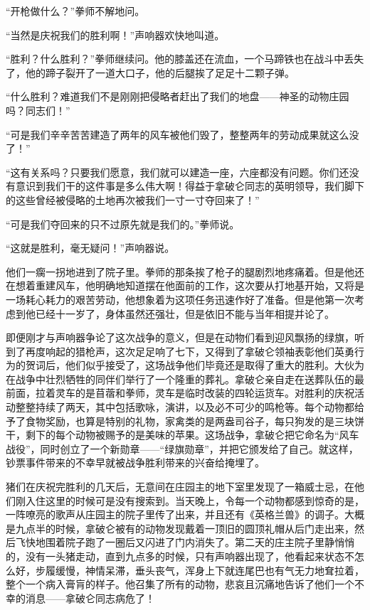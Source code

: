 “开枪做什么？”拳师不解地问。

“当然是庆祝我们的胜利啊！”声响器欢快地叫道。

“胜利？什么胜利？”拳师继续问。他的膝盖还在流血，一个马蹄铁也在战斗中丢失了，他的蹄子裂开了一道大口子，他的后腿挨了足足十二颗子弹。

“什么胜利？难道我们不是刚刚把侵略者赶出了我们的地盘——神圣的动物庄园吗？同志们！”

“可是我们辛辛苦苦建造了两年的风车被他们毁了，整整两年的劳动成果就这么没了！”

“这有关系吗？只要我们愿意，我们就可以建造一座，六座都没有问题。你们还没有意识到我们干的这件事是多么伟大啊！得益于拿破仑同志的英明领导，我们脚下的这些曾经被侵略的土地再次被我们一寸一寸夺回来了！”

“可是我们夺回来的只不过原先就是我们的。”拳师说。

“这就是胜利，毫无疑问！”声响器说。

他们一瘸一拐地进到了院子里。拳师的那条挨了枪子的腿剧烈地疼痛着。但是他还在想着重建风车，他明确地知道摆在他面前的工作，这次要从打地基开始，又将是一场耗心耗力的艰苦劳动，他想象着为这项任务迅速作好了准备。但是他第一次考虑到他已经十一岁了，身体虽然还强壮，但是依旧不能与当年相提并论了。

即便刚才与声响器争论了这次战争的意义，但是在动物们看到迎风飘扬的绿旗，听到了再度响起的猎枪声，这次足足响了七下，又得到了拿破仑领袖表彰他们英勇行为的贺词后，他们似乎接受了，这场战争他们毕竟还是取得了重大的胜利。大伙为在战争中壮烈牺牲的同伴们举行了一个隆重的葬礼。拿破仑亲自走在送葬队伍的最前面，拉着灵车的是苜蓿和拳师，灵车是临时改装的四轮运货车。对胜利的庆祝活动整整持续了两天，其中包括歌咏，演讲，以及必不可少的鸣枪等。每个动物都给予了食物奖励，也算是特别的礼物，家禽类的是两盎司谷子，每只狗发的是三块饼干，剩下的每个动物被赐予的是美味的苹果。这场战争，拿破仑把它命名为“风车战役”，同时创立了一个新勋章——“绿旗勋章”，并把它颁发给了自己。就这样，钞票事件带来的不幸早就被战争胜利带来的兴奋给掩埋了。

猪们在庆祝完胜利的几天后，无意间在庄园主的地下室里发现了一箱威士忌，在他们刚入住这里的时候可是没有搜索到。当天晚上，令每一个动物都感到惊奇的是，一阵嘹亮的歌声从庄园主的院子里传了出来，并且还有《英格兰兽》的调子。大概是九点半的时候，拿破仑被有的动物发现戴着一顶旧的圆顶礼帽从后门走出来，然后飞快地围着院子跑了一圈后又闪进了门内消失了。第二天的庄主院子里静悄悄的，没有一头猪走动，直到九点多的时候，只有声响器出现了，他看起来状态不怎么好，步履缓慢，神情呆滞，垂头丧气，浑身上下就连尾巴也有气无力地耷拉着，整个一个病入膏肓的样子。他召集了所有的动物，悲哀且沉痛地告诉了他们一个不幸的消息——拿破仑同志病危了！

